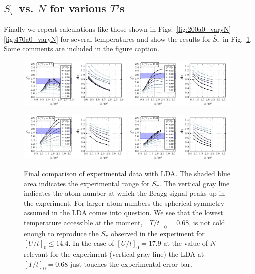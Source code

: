 \documentclass[11pt,letter]{article}
\begin{document}
\subsection{ $\bar{S}_{\pi}$ vs. $N$ for various $T$'s} 

Finally we repeat calculations like those shown in
Figs.~\ref{fig:200a0_varyN}-\ref{fig:470a0_varyN} for several temperatures and
show the results for $\bar{S}_{\pi}$  in Fig.~\ref{fig:bulkSPI}.  Some comments
are included in the figure caption.  
\begin{figure}
    \centering
\includegraphics[width=0.48\textwidth]{../dataplots/SPI/200/spis.png}
\includegraphics[width=0.48\textwidth]{../dataplots/SPI/290/spis.png}

\includegraphics[width=0.48\textwidth]{../dataplots/SPI/380/spis.png}
\includegraphics[width=0.48\textwidth]{../dataplots/SPI/470/spis.png} \caption{
Final comparison of experimental data with LDA.  The shaded blue area indicates
the experimental range for $\bar{S}_{\pi}$.  The vertical gray line indicates
the atom number at which the Bragg signal peaks up in the experiment.   For
larger atom numbers the spherical symmetry assumed in the LDA comes into
question.  We see that the lowest temperature accessible at the moment,
$[T/t]_{0}=0.68$, is not cold enough to reproduce the $\bar{S}_{\pi}$ observed
in the experiment for $[U/t]_{0}\leq 14.4$.  In the case of $[U/t]_{0}=17.9$ at
the value of $N$ relevant for the experiment (vertical gray line) the LDA at
$[T/t]_{0}=0.68$ just touches the experimental error bar.    } 
\label{fig:bulkSPI}
\end{figure}



 
 

 
 
\end{document}
